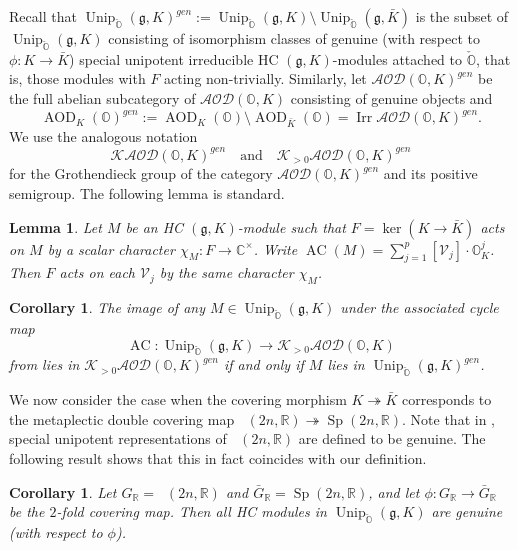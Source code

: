 \documentclass[11pt, a4paper]{amsart}
\newcommand{\C}{\mathbb{C}}
\newcommand{\g}{\mathfrak{g}}
\newcommand{\orb}{\mathbb{O}}
\newcommand{\orbk}{\orb_{K}}
\newcommand{\fk}{\mathfrak{k}}
\newcommand{\ckorb}{\check{\orb}}
\newcommand{\cK}{\mathcal{K}}
\newcommand{\cV}{\mathcal{V}}
\DeclareMathOperator{\AC}{AC}
\DeclareMathOperator{\AOD}{AOD}
\DeclareMathOperator{\Unip}{Unip}
\DeclareMathOperator{\Mp}{\widetilde{Sp}}
\newcommand{\AODK}{\AOD_K}
\newcommand{\cAOD}{\mathcal{AOD}}
\newcommand{\UnipOv}{\Unip_{\ckorb}}
\newcommand{\Sp}{\operatorname{Sp}}
\newcommand{\R}{\mathbb{R}}
\newcommand{\cm}{\C^\times}
\newcommand{\GR}{G_\R}
\newcommand{\Irr}{\operatorname{Irr}}
\newtheorem{Cor}[Thm]{Corollary}
\newtheorem{Lem}[Thm]{Lemma}
\theoremstyle{definition}
\numberwithin{equation}{section}
\begin{document}
Recall that $\UnipOv(\g,K)^{gen} := \UnipOv(\g,K) \setminus \UnipOv(\g, \bar{K})$ is the subset of $\UnipOv(\g,K)$ consisting of isomorphism classes of genuine (with respect to $\phi: K \to \bar{K}$) special unipotent irreducible HC $(\g,K)$-modules attached to $\ckorb$, that is, those modules with $F$ acting non-trivially. Similarly, let $\cAOD(\orb,K)^{gen}$ be the full abelian subcategory of $\cAOD(\orb,K)$ consisting of genuine objects and 
	\[\AODK(\orb)^{gen} := \AODK(\orb) \setminus \AOD_{\bar{K}}(\orb) = \Irr \cAOD(\orb,K)^{gen}. \]
We use the analogous notation
\[
	\cK\cAOD(\orb,K)^{gen} \quad \text{and} \quad \cK_{>0}\cAOD(\orb, K)^{gen}
\]
for the Grothendieck group of the category $\cAOD(\orb, K)^{gen}$ and its positive semigroup.
The following lemma is standard.

\begin{Lem}\label{lem:AC_gen_F}
	Let $M$ be an HC $(\g,K)$-module such that $F = \ker(K \to \bar{K})$ acts on $M$ by a scalar character $\chi_M: F \to \cm$. Write $\AC(M) = \sum_{j=1}^p [\cV_j] \cdot \orbk^j$. Then $F$ acts on each $\cV_j$ by the same character $\chi_M$.
\end{Lem}

\begin{Cor}\label{cor:AC_special_gen}
	The image of any $M \in \UnipOv(\g, K)$ under the associated cycle map 
	\[ \AC: \UnipOv(\g, K) \xrightarrow{\ \ } \cK_{>0}\cAOD(\orb, K) \]
	from  lies in $\cK_{>0}\cAOD(\orb, K)^{gen}$ if and only if $M$ lies in $\UnipOv(\g, K)^{gen}$.
\end{Cor}

We now consider the case when the covering morphism $K \twoheadrightarrow \bar{K}$ corresponds to the metaplectic double covering map $\Mp(2n,\R) \twoheadrightarrow \Sp(2n,\R)$. Note that in \cite[Section 2.3]{BMSZ:counting}, special unipotent representations of $\Mp(2n,\R)$ are defined to be genuine. The following result shows that this in fact coincides with our definition.

\begin{Cor}\label{cor:metaplectic_genuine}
	Let $\GR = \Mp(2n,\R)$ and $\bar{G}_\R = \Sp(2n,\R)$, and let $\phi: \GR \to \bar{G}_\R$ be the $2$-fold covering map. Then all HC modules in $\UnipOv(\g, K)$ are genuine (with respect to $\phi$).
\end{Cor}
\end{document}
